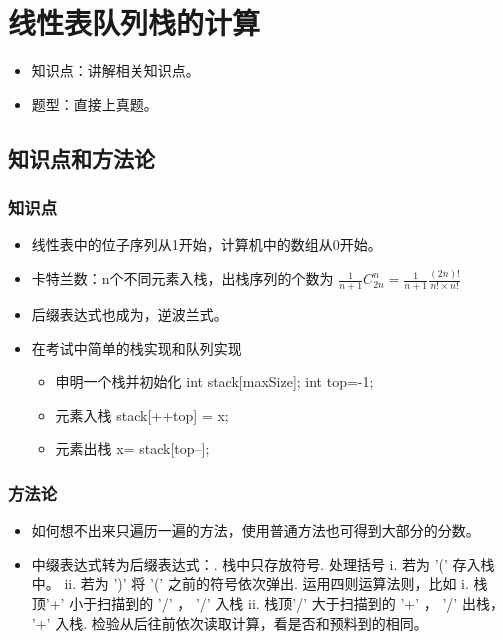 \chapter{线性表队列栈的计算}
\label{chap12}
\begin{itemize}[noitemsep,topsep=0pt,parsep=0pt,partopsep=0pt]
	\item 知识点：讲解相关知识点。
	\item 题型：直接上真题。
\end{itemize}

\section{知识点和方法论}

\subsection{知识点}
\begin{itemize}[noitemsep,topsep=0pt,parsep=0pt,partopsep=0pt]
	\item 线性表中的位子序列从{\color{red}1}开始，计算机中的数组从{\color{red}0}开始。
	\item 卡特兰数：n个不同元素入栈，出栈序列的个数为 $\frac{1}{n+1} C^{n}_{2n} = \frac{1}{n+1}\frac{(2n)!}{n! \times n!} $
	\item 后缀表达式也成为，逆波兰式。
	\item 在考试中简单的栈实现和队列实现
	\begin{itemize}[noitemsep,topsep=0pt,parsep=0pt,partopsep=0pt]
		\item 申明一个栈并初始化 int stack[maxSize]; int top=-1;
		\item 元素入栈 stack[++top] = x;
		\item 元素出栈 x= stack[top--];
	\end{itemize}
\end{itemize}

\subsection{方法论}
\begin{itemize}[noitemsep,topsep=0pt,parsep=0pt,partopsep=0pt]
	\item 如何想不出来只遍历一遍的方法，使用普通方法也可得到大部分的分数。
	\item 中缀表达式转为后缀表达式：. 栈中只存放符号. 处理括号\newline
			i. 若为 '(' 存入栈中。\newline
			ii. 若为 ')' 将 '(' 之前的符号依次弹出. 运用四则运算法则，比如\newline
			i.  栈顶'+' 小于扫描到的 '/' ， '/' 入栈\newline
			ii. 栈顶'/' 大于扫描到的 '+' ， '/' 出栈， '+' 入栈. 检验从后往前依次读取计算，看是否和预料到的相同。\newline
\end{itemize}

